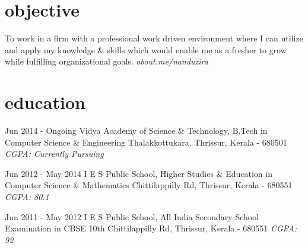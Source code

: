 \documentclass[]{friggeri-cv}
\begin{document}
	
\newline

\section{objective}
\begin{entrylist}

	\entry
	{}
    {{\normalfont To work in a firm with a professional work driven environment where I can utilize and apply my knowledge \& skills which would enable me as a fresher to grow while fulfilling organizational goals.}}
    {\emph{about.me/nanduzira}}
	{}
\end{entrylist}
\newline

\section{education}
\begin{entrylist}
	
	\entry
	{Jun 2014 - Ongoing}
	{Vidya Academy of Science \& Technology, {\normalfont B.Tech in Computer Science \& Engineering \newline}}
	{Thalakkottukara, Thrissur, Kerala - 680501}
	{\emph{CGPA: Currently Pursuing}}
	  
	
	\entry
	{Jun 2012 - May 2014}
	{I E S Public School, {\normalfont Higher Studies \& Education in Computer Science \& Mathematics \newline}}
	{Chittilappilly Rd, Thrissur, Kerala - 680551}
	{\emph{CGPA: 80.1}}
    
    
	\entry
	{Jun 2011 - May 2012}
	{I E S Public School, {\normalfont All India Secondary School Examination in CBSE 10th \newline }}
	{Chittilappilly Rd, Thrissur, Kerala - 680551}
	{\emph{CGPA: 92}}
	  
\end{entrylist}
\newline
\end{document}
